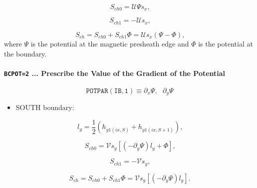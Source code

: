 \documentclass[11pt]{article}
\begin{document}
\begin{equation}
S_{ch0}=\mathcal{U}\Psi s_{x}\text{,}   \label{c299}
\end{equation}

\begin{equation}
S_{ch1}=-\mathcal{U}s_{x}\text{,}   \label{c300}
\end{equation}

\begin{equation}
S_{ch}=S_{ch0}+S_{ch1}\Phi=\mathcal{U}s_{x}\left( \Psi-\Phi\right) \text{,} 
\label{c301}
\end{equation}
where $\Psi$ is the potential at the magnetic presheath edge and $\Phi$ is
the potential at the boundary.

\bigskip

\paragraph{\texttt{BCPOT=2} ... Prescribe the Value of the Gradient of the
Potential}

\bigskip

\begin{equation*}
\mathtt{POTPAR(IB,1)}\equiv\partial_{x}\Psi,\text{ }\partial_{y}\Psi 
\end{equation*}

\bigskip

\begin{itemize}
\item  SOUTH boundary:
\end{itemize}

\bigskip

\begin{equation}
l_{y}=\frac{1}{2}\left( h_{y1\left( ix,S\right) }+h_{y1\left( ix,S+1\right)
}\right) \text{,}   \label{c302a}
\end{equation}

\begin{equation}
S_{ch0}=\mathcal{V}s_{y}\left[ \left( -\partial_{y}\Psi\right) l_{y}+\Phi%
\right] \text{,}   \label{c302}
\end{equation}

\begin{equation}
S_{ch1}=-\mathcal{V}s_{y}\text{,}   \label{c303}
\end{equation}

\begin{equation}
S_{ch}=S_{ch0}+S_{ch1}\Phi=\mathcal{V}s_{y}\left[ \left(
-\partial_{y}\Psi\right) l_{y}\right] \text{.}   \label{c304}
\end{equation}
\end{document}
